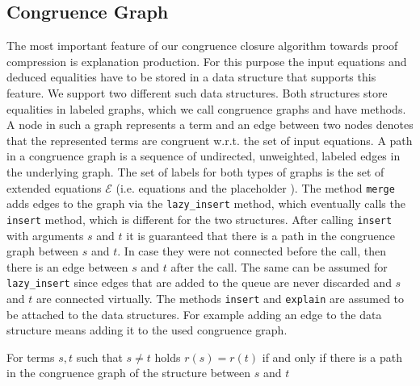 \subsection*{Congruence Graph}
\label{sec:congruencegraph}
The most important feature of our congruence closure algorithm towards proof compression is explanation production.
For this purpose the input equations and deduced equalities have to be stored in a data structure that supports this feature.
We support two different such data structures.
Both structures store equalities in labeled graphs, which we call congruence graphs and have methods.
A node in such a graph represents a term and an edge between two nodes denotes that the represented terms are congruent w.r.t. the set of input equations.
A path in a congruence graph is a sequence of undirected, unweighted, labeled edges in the underlying graph.
The set of labels for both types of graphs is the set of extended equations $\mathcal{E}$ (i.e. equations and the placeholder \smiley).
The method \texttt{merge} adds edges to the graph via the \texttt{lazy\_insert} method, which eventually calls the \texttt{insert} method, which is different for the two structures.
After calling \texttt{insert} with arguments $s$ and $t$ it is guaranteed that there is a path in the congruence graph between $s$ and $t$.
In case they were not connected before the call, then there is an edge between $s$ and $t$ after the call.
The same can be assumed for \texttt{lazy\_insert} since edges that are added to the queue are never discarded and $s$ and $t$ are connected virtually.
The methods \texttt{insert} and \texttt{explain} are assumed to be attached to the data structures.
For example adding an edge to the data structure means adding it to the used congruence graph.

\begin{invariant}[Paths]

For terms $s, t$ such that $s \neq t$ holds $r(s) = r(t)$ if and only if there is a path in the congruence graph of the structure between $s$ and $t$

\end{invariant}


